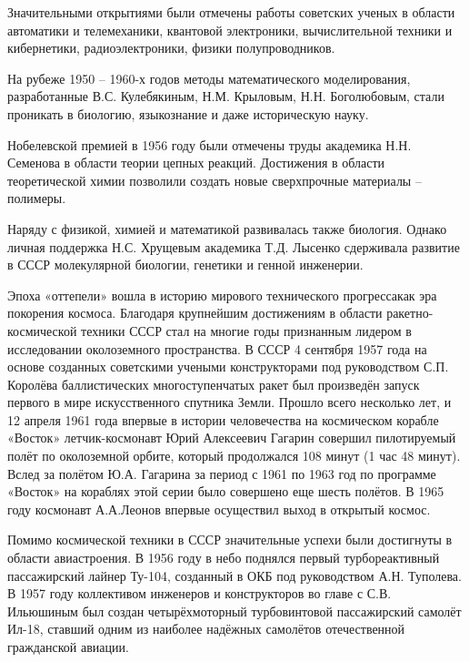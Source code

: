 \documentclass{article}
\begin{document}
\hfill

Значительными открытиями были отмечены работы советских ученых в области автоматики и телемеханики, квантовой электроники, вычислительной техники и кибернетики, радиоэлектроники, физики полупроводников.

\hfill

На рубеже 1950 – 1960-х годов методы математического моделирования, разработанные В.С. Кулебякиным, Н.М. Крыловым, Н.Н. Боголюбовым, стали проникать в биологию, языкознание и даже историческую науку.

\hfill

Нобелевской премией в 1956 году были отмечены труды академика Н.Н. Семенова в области теории цепных реакций. Достижения в области теоретической химии позволили создать новые сверхпрочные материалы – полимеры.

\hfill

Наряду с физикой, химией и математикой развивалась также биология. Однако личная поддержка Н.С. Хрущевым академика Т.Д. Лысенко сдерживала развитие в СССР молекулярной биологии, генетики и генной инженерии.

\hfill

Эпоха «оттепели» вошла в историю мирового технического прогрессакак эра покорения космоса. Благодаря крупнейшим достижениям в области ракетно-космической техники СССР стал на многие годы признанным лидером в исследовании околоземного пространства. В СССР 4 сентября 1957 года на основе созданных советскими учеными конструкторами под руководством С.П. Королёва баллистических многоступенчатых ракет был произведён запуск первого в мире искусственного спутника Земли. Прошло всего несколько лет, и 12 апреля 1961 года впервые в истории человечества на космическом корабле «Восток» летчик-космонавт Юрий Алексеевич Гагарин совершил пилотируемый полёт по околоземной орбите, который продолжался 108 минут (1 час 48 минут). Вслед за полётом Ю.А. Гагарина за период с 1961 по 1963 год по программе «Восток» на кораблях этой серии было совершено еще шесть полётов. В 1965 году космонавт А.А.Леонов впервые осуществил выход в открытый космос.

\hfill

Помимо космической техники в СССР значительные успехи были достигнуты в области авиастроения. В 1956 году в небо поднялся первый турбореактивный пассажирский лайнер Ту-104, созданный в ОКБ под руководством А.Н. Туполева. В 1957 году коллективом инженеров и конструкторов во главе с С.В. Ильюшиным был создан четырёхмоторный турбовинтовой пассажирский самолёт Ил-18, ставший одним из наиболее надёжных самолётов отечественной гражданской авиации.
\end{document}
